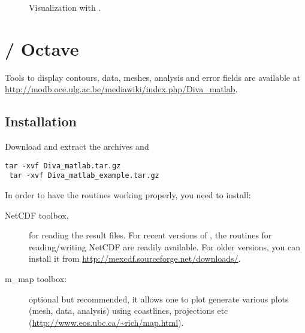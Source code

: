 \begin{figure}[htpb]
\centering
{}

\caption{Visualization with \gnuplot.\label{fig:gnuplotexamples}}
\end{figure}


\section{\matlab / Octave}


Tools to display contours, data, meshes, analysis and error fields are available at \url{http://modb.oce.ulg.ac.be/mediawiki/index.php/Diva_matlab}. 

\subsection{Installation}

Download and extract the archives  and 
\begin{lstlisting}[style=Bash]
 tar -xvf Diva_matlab.tar.gz
 tar -xvf Diva_matlab_example.tar.gz
\end{lstlisting}

In order to have the routines working properly, you need to install:
\begin{description}
\item[NetCDF toolbox,] for reading the result files. For recent versions of \matlab, the routines for reading/writing NetCDF are readily available. For older versions, you can install it from \url{http://mexcdf.sourceforge.net/downloads/}.
\item[m\_map toolbox:] optional but recommended, it allows one to plot generate various plots (mesh, data, analysis) using coastlines, projections etc (\url{http://www.eos.ubc.ca/~rich/map.html}). 
\end{description}
    

